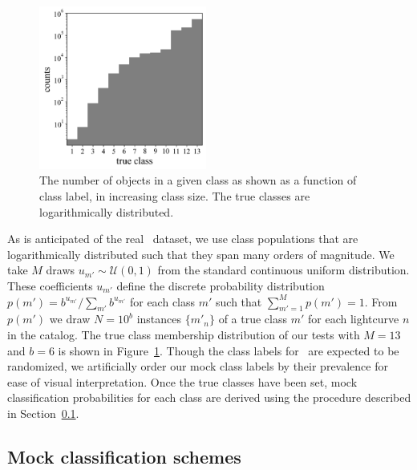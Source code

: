 \begin{figure}
	\begin{center}
    \includegraphics[width=0.49\textwidth]{./fig/complete_counts.png}
		\caption{The number of objects in a given class as shown as a function of class label, in increasing class size.
		The true classes are logarithmically distributed.}
		\label{fig:classdist}
	\end{center}
\end{figure}

As is anticipated of the real \lsst\ dataset, we use class populations that are logarithmically distributed such that they span many orders of magnitude.
We take $M$ draws $u_{m'} \sim \mathcal{U}(0, 1)$ from the standard continuous uniform distribution.
These coefficients $u_{m'}$ define the discrete probability distribution $p(m') = b^{u_{m'}} / \sum_{m'} b^{u_{m'}}$ for each class $m'$ such that $\sum_{m'=1}^{M} p(m') = 1$.
From $p(m')$ we draw $N = 10^{b}$ instances $\{m'_{n}\}$ of a true class $m'$ for each lightcurve $n$ in the catalog.
The true class membership distribution of our tests with $M = 13$ and $b = 6$ is shown in Figure~\ref{fig:classdist}.
Though the class labels for \plasticc\ are expected to be randomized, we artificially order our mock class labels by their prevalence for ease of visual interpretation.
Once the true classes have been set, mock classification probabilities for each class are derived using the procedure described in Section~\ref{sec:mockdata}.

\subsection{Mock classification schemes}
\label{sec:mockdata}

